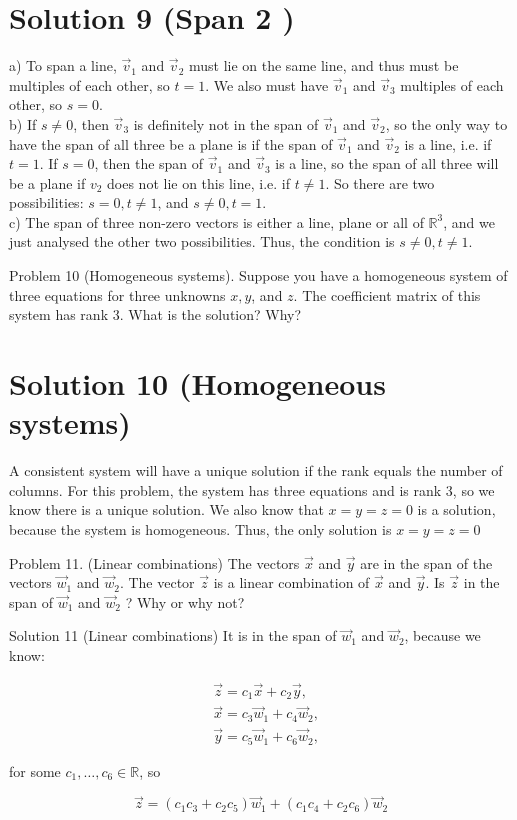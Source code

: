 \documentclass[10pt]{article}
\begin{document}
\section*{Solution 9 (Span 2 )}
a) To span a line, $\vec{v}_{1}$ and $\vec{v}_{2}$ must lie on the same line, and thus must be multiples of each other, so $t=1$. We also must have $\vec{v}_{1}$ and $\vec{v}_{3}$ multiples of each other, so $s=0$.\\
b) If $s \neq 0$, then $\vec{v}_{3}$ is definitely not in the span of $\vec{v}_{1}$ and $\vec{v}_{2}$, so the only way to have the span of all three be a plane is if the span of $\vec{v}_{1}$ and $\vec{v}_{2}$ is a line, i.e. if $t=1$. If $s=0$, then the span of $\vec{v}_{1}$ and $\vec{v}_{3}$ is a line, so the span of all three will be a plane if $v_{2}$ does not lie on this line, i.e. if $t \neq 1$. So there are two possibilities: $s=0, t \neq 1$, and $s \neq 0, t=1$.\\
c) The span of three non-zero vectors is either a line, plane or all of $\mathbb{R}^{3}$, and we just analysed the other two possibilities. Thus, the condition is $s \neq 0, t \neq 1$.

Problem 10 (Homogeneous systems). Suppose you have a homogeneous system of three equations for three unknowns $x, y$, and $z$. The coefficient matrix of this system has rank 3. What is the solution? Why?

\section*{Solution 10 (Homogeneous systems)}
A consistent system will have a unique solution if the rank equals the number of columns. For this problem, the system has three equations and is rank 3, so we know there is a unique solution. We also know that $x=y=z=0$ is a solution, because the system is homogeneous. Thus, the only solution is $x=y=z=0$

Problem 11. (Linear combinations) The vectors $\vec{x}$ and $\vec{y}$ are in the span of the vectors $\vec{w}_{1}$ and $\vec{w}_{2}$. The vector $\vec{z}$ is a linear combination of $\vec{x}$ and $\vec{y}$. Is $\vec{z}$ in the span of $\vec{w}_{1}$ and $\vec{w}_{2}$ ? Why or why not?

Solution 11 (Linear combinations) It is in the span of $\vec{w}_{1}$ and $\vec{w}_{2}$, because we know:

$$
\begin{aligned}
& \vec{z}=c_{1} \vec{x}+c_{2} \vec{y}, \\
& \vec{x}=c_{3} \vec{w}_{1}+c_{4} \vec{w}_{2}, \\
& \vec{y}=c_{5} \vec{w}_{1}+c_{6} \vec{w}_{2},
\end{aligned}
$$

for some $c_{1}, \ldots, c_{6} \in \mathbb{R}$, so

$$
\vec{z}=\left(c_{1} c_{3}+c_{2} c_{5}\right) \vec{w}_{1}+\left(c_{1} c_{4}+c_{2} c_{6}\right) \vec{w}_{2}
$$
\end{document}
